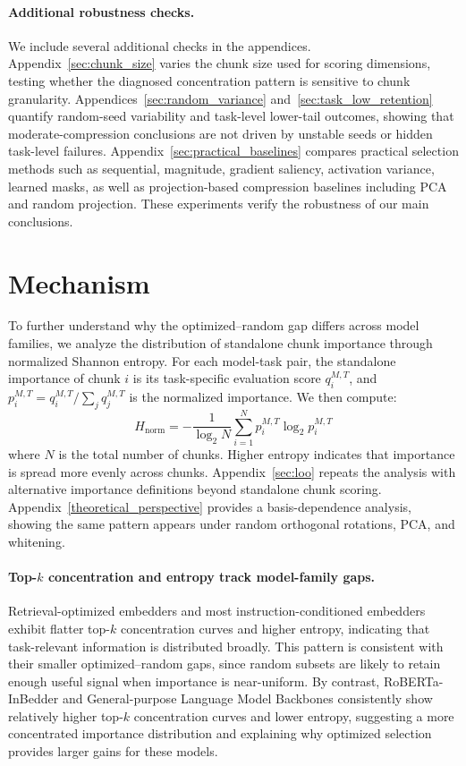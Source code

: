 \documentclass[11pt]{article}
\begin{document}
\paragraph{Additional robustness checks.}
We include several additional checks in the appendices. Appendix~\ref{sec:chunk_size} varies the chunk size used for scoring dimensions, testing whether the diagnosed concentration pattern is sensitive to chunk granularity. 
Appendices~\ref{sec:random_variance} and~\ref{sec:task_low_retention} quantify random-seed variability and task-level lower-tail outcomes, showing that moderate-compression conclusions are not driven by unstable seeds or hidden task-level failures.
Appendix~\ref{sec:practical_baselines} compares practical selection methods such as sequential, magnitude, gradient saliency, activation variance, learned masks, as well as projection-based compression baselines including PCA and random projection. These experiments verify the robustness of our main conclusions.


\section{Mechanism}
To further understand why the optimized--random gap differs across model families, we analyze the distribution of
standalone chunk importance through normalized Shannon entropy. For each model-task pair, the standalone importance of chunk $i$ is its task-specific evaluation score $q_i^{M,T}$, and $ p_i^{M,T} = q_i^{M,T}/\sum_j q_j^{M,T}$ is the normalized importance. We then compute:
\begin{equation}
H_{\text{norm}} = -\frac{1}{\log_2 N} \sum_{i=1}^{N} p_i^{M,T} \log_2 p_i^{M,T}
\end{equation}
where $N$ is the total number of chunks. Higher entropy indicates that importance is spread more evenly across chunks. Appendix~\ref{sec:loo} repeats the analysis with alternative importance definitions beyond standalone chunk scoring. Appendix~\ref{theoretical_perspective} provides a basis-dependence analysis, showing the same pattern appears under random orthogonal rotations, PCA, and whitening.

\paragraph{Top-$k$ concentration and entropy track model-family gaps.}
Retrieval-optimized embedders and most instruction-conditioned embedders exhibit flatter top-$k$ concentration curves and higher entropy, indicating that task-relevant information is distributed broadly. This pattern is consistent with their smaller optimized--random gaps, since random subsets are likely to retain enough useful signal when importance is near-uniform. By contrast, RoBERTa-InBedder and General-purpose Language Model Backbones consistently show relatively higher top-$k$ concentration curves and lower entropy, suggesting a more concentrated importance distribution and explaining why optimized selection provides larger gains for these models.
\end{document}
